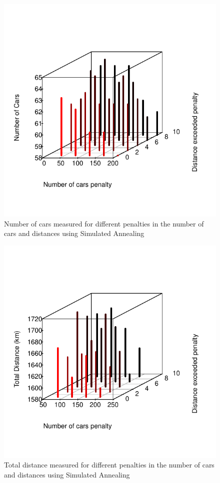 \documentclass[12]{article}
\begin{document}
\begin{figure}[H]
  \captionsetup{justification=centering}
   \centering
    \includegraphics[scale=0.8]{Results/data_6_2.pdf}
      \caption{Number of cars measured for different penalties in the number of cars and distances using Simulated Annealing}
      \label{fig:data_6_2}
  \end{figure}
    \vspace{1cm}

\begin{figure}[H]
  \captionsetup{justification=centering}
   \centering
    \includegraphics[scale=0.8]{Results/data_6_3.pdf}
      \caption{Total distance measured for different penalties in the number of cars and distances using Simulated Annealing}
      \label{fig:data_6_3}
  \end{figure}
    \vspace{1cm}
\end{document}

